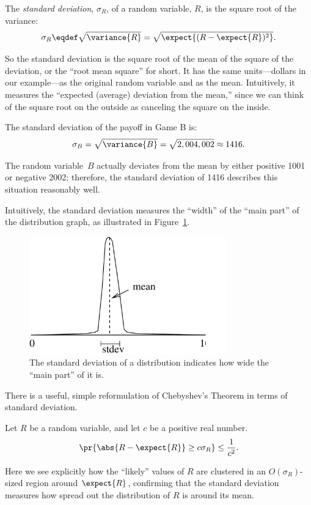 \begin{definition}
The \emph{standard deviation}, $\sigma_R$, of a random variable, $R$, is
the square root of the variance:
\[
\sigma_R \eqdef \sqrt{\variance{R}} = \sqrt{\expect{(R - \expect{R})^2}}.
\]      
\end{definition}

So the standard deviation is the square root of the mean of the square of
the deviation, or the ``root mean square'' for short.  It has the same
units---dollars in our example---as the original random variable and as
the mean.  Intuitively, it measures the ``expected (average) deviation
from the mean,'' since we can think of the square root on the outside as
canceling the square on the inside.

\begin{example}
The standard deviation of the payoff in Game B is:
\[
    \sigma_B  = \sqrt{\variance{B}} = \sqrt{2,004,002} \approx 1416.
\]

The random variable~$B$ actually deviates from the mean by either
positive 1001  or negative 2002; therefore, the standard
deviation of 1416 describes this situation reasonably well.
\end{example}

Intuitively, the standard deviation measures the ``width'' of the ``main
part'' of the distribution graph, as illustrated in
Figure~\ref{fig:stdev}.
\begin{figure}
  \centerline{\includegraphics[height=2in]{figures/stdev}}
  \caption{The standard deviation of a distribution indicates how wide the
    ``main part'' of it is.}
  \label{fig:stdev}
\end{figure}

There is a useful, simple reformulation of Chebyshev's Theorem in terms of
standard deviation.
\begin{corollary}
\label{cor:cheby}
Let $R$ be a random variable, and let $c$ be a positive real number.
\[
\pr{\abs{R - \expect{R}} \geq c \sigma_R} \leq \frac{1}{c^2}.
\]
\end{corollary}
Here we see explicitly how the ``likely'' values of $R$ are clustered in
an $O(\sigma_R)$-sized region around $\expect{R}$, confirming that the
standard deviation measures how spread out the distribution of $R$ is
around its mean.

